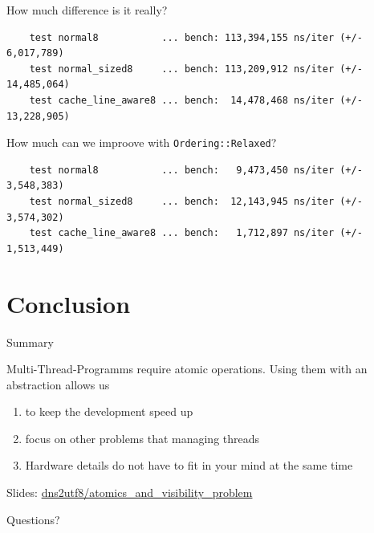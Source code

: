 \documentclass[10pt,aspectratio=169]{beamer}
\begin{document}
\begin{frame}[fragile]{How much difference is it really?}
\begin{verbatim}
    test normal8           ... bench: 113,394,155 ns/iter (+/- 6,017,789)
    test normal_sized8     ... bench: 113,209,912 ns/iter (+/- 14,485,064)
    test cache_line_aware8 ... bench:  14,478,468 ns/iter (+/- 13,228,905)
\end{verbatim}
\end{frame}

\begin{frame}[fragile]{How much can we improove with \alert{\texttt{Ordering::Relaxed}}?}
\begin{verbatim}
    test normal8           ... bench:   9,473,450 ns/iter (+/- 3,548,383)
    test normal_sized8     ... bench:  12,143,945 ns/iter (+/- 3,574,302)
    test cache_line_aware8 ... bench:   1,712,897 ns/iter (+/- 1,513,449)
\end{verbatim}
\end{frame}

\section{Conclusion}

\begin{frame}{Summary}

  Multi-Thread-Programms require atomic operations.
  Using them with an abstraction allows us
  \begin{enumerate}
      \item to keep the development speed up
      \item focus on other problems that managing threads
      \item Hardware details do not have to fit in your mind at the same time
  \end{enumerate} 

  \begin{center}Slides: \href{https://github.com/dns2utf8/atomics_and_visibility_problem}{dns2utf8/atomics\_and\_visibility\_problem}\end{center}


\end{frame}

{
\begin{frame}[standout]
  Questions?
\end{frame}
}
\end{document}
